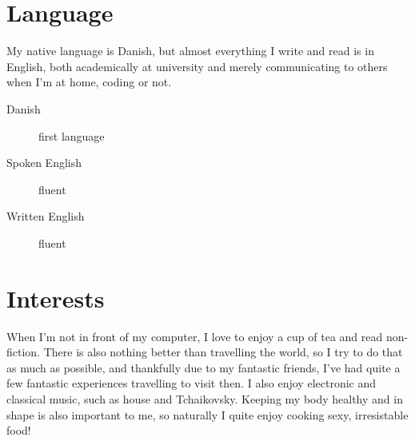\documentclass[margin,line,a4paper]{resume}
\begin{document}
\begin{resume}
\section{\mysidestyle Language}
My native language is Danish, but almost everything I write and read is
in English, both academically at university and merely communicating to
others when I'm at home, coding or not.

\begin{description}
  \item[Danish] first language
  \item[Spoken English] fluent
  \item[Written English] fluent 
\end{description}

\section{\mysidestyle Interests}
When I'm not in front of my computer, I love to enjoy a cup of tea and read non-fiction. There is also nothing better than travelling the world, so I try to do that as much as possible, and thankfully due to my fantastic friends, I've had quite a few fantastic experiences travelling to visit then. I also enjoy electronic and classical music, such as house and Tchaikovsky. Keeping my body healthy and in shape is also important to me, so naturally I quite enjoy cooking sexy, irresistable food!
\end{resume}
\end{document}
